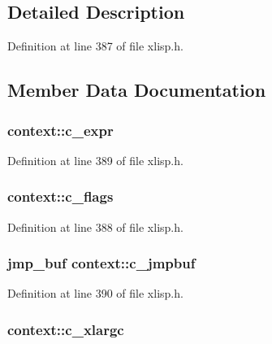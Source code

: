 \subsection{Detailed Description}


Definition at line 387 of file xlisp.\+h.



\subsection{Member Data Documentation}
\subsubsection[{\texorpdfstring{c\+\_\+expr}{c_expr}}]{ context\+::c\+\_\+expr}\hypertarget{structcontext_a230c537ba0567c96a7adb503ef3f60f6}{}\label{structcontext_a230c537ba0567c96a7adb503ef3f60f6}


Definition at line 389 of file xlisp.\+h.

\subsubsection[{\texorpdfstring{c\+\_\+flags}{c_flags}}]{ context\+::c\+\_\+flags}\hypertarget{structcontext_a7062c84d18a7cf165dabd8374ac5c34c}{}\label{structcontext_a7062c84d18a7cf165dabd8374ac5c34c}


Definition at line 388 of file xlisp.\+h.

\subsubsection[{\texorpdfstring{c\+\_\+jmpbuf}{c_jmpbuf}}]{\setlength{\rightskip}{0pt plus 5cm}jmp\+\_\+buf context\+::c\+\_\+jmpbuf}\hypertarget{structcontext_a927d089e4e08536e2ac562a8c0f1c482}{}\label{structcontext_a927d089e4e08536e2ac562a8c0f1c482}


Definition at line 390 of file xlisp.\+h.

\subsubsection[{\texorpdfstring{c\+\_\+xlargc}{c_xlargc}}]{ context\+::c\+\_\+xlargc}\hypertarget{structcontext_a0b1153f557a555aa960fdc31dcddb719}{}\label{structcontext_a0b1153f557a555aa960fdc31dcddb719}


